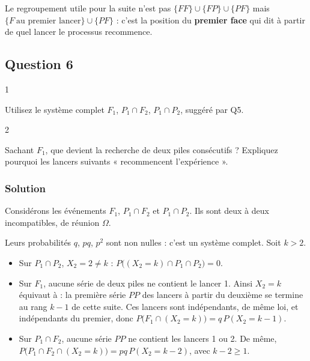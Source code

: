 \documentclass[11pt,a4paper]{article}
\providecommand{\tightlist}{\setlength{\itemsep}{0pt}\setlength{\parskip}{0pt}}
\begin{document}
\begin{methode}

Le regroupement utile pour la suite n'est pas \(\{FF\}\cup\{FP\}\cup\{PF\}\) mais \(\{F\ \text{au premier lancer}\}\cup\{PF\}\) : c'est la position du \textbf{premier face} qui dit à partir de quel lancer le processus recommence.

\end{methode}

\hypertarget{question-6}{%
\subsection{Question 6}\label{question-6}}

\begin{indication}{1}

Utilisez le système complet \(F_1\), \(P_1\cap F_2\), \(P_1\cap P_2\), suggéré par Q5.

\end{indication}

\begin{indication}{2}

Sachant \(F_1\), que devient la recherche de deux piles consécutifs ? Expliquez pourquoi les lancers suivants « recommencent l'expérience ».

\end{indication}

\hypertarget{solution-5}{%
\subsubsection{Solution}\label{solution-5}}

Considérons les événements \(F_1\), \(P_1\cap F_2\) et \(P_1\cap P_2\). Ils sont deux à deux incompatibles, de réunion \(\Omega\).

Leurs probabilités \(q\), \(pq\), \(p^2\) sont non nulles : c'est un système complet. Soit \(k>2\).

\begin{itemize}
\tightlist
\item
  Sur \(P_1\cap P_2\), \(X_2=2\neq k\) : \(P\big((X_2=k)\cap P_1\cap P_2\big)=0\).
\item
  Sur \(F_1\), aucune série de deux piles ne contient le lancer 1. Ainsi \(X_2=k\) équivaut à : la première série \(PP\) des lancers à partir du deuxième se termine au rang \(k-1\) de cette suite. Ces lancers sont indépendants, de même loi, et indépendants du premier, donc \(P\big(F_1\cap(X_2=k)\big)=q\,P(X_2=k-1)\).
\item
  Sur \(P_1\cap F_2\), aucune série \(PP\) ne contient les lancers 1 ou 2. De même, \(P\big(P_1\cap F_2\cap(X_2=k)\big)=pq\,P(X_2=k-2)\), avec \(k-2\geqslant1\).
\end{itemize}
\end{document}
